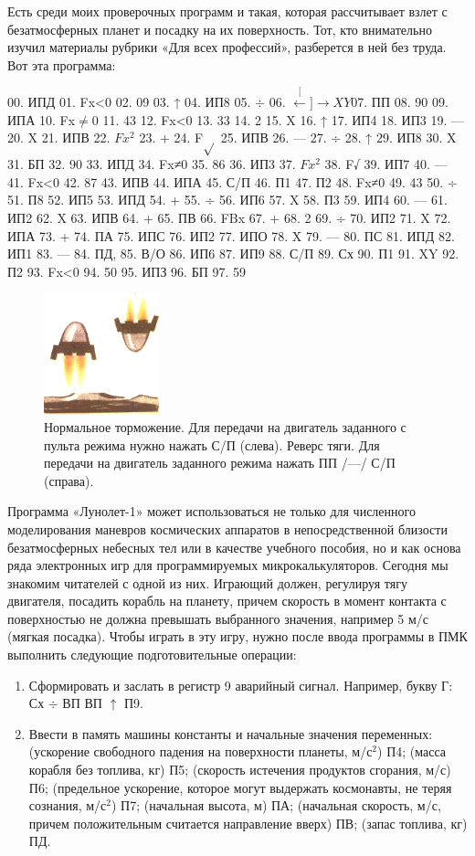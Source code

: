 \documentclass[11pt,a4paper,oneside]{article}
\def\XY{$\stackrel[\leftarrow]{\rightarrow}{XY}$}
\begin{document}
Есть среди моих проверочных программ и такая, которая рассчитывает взлет с безатмосферных планет и посадку на их поверхность. Тот, кто внимательно изучил материалы рубрики «Для всех профессий», разберется в ней без труда. Вот эта программа:

00. ИПД 01. Fx<0 02. 09 03. ↑ 04. ИП8 05. $\div$ 06. \XY 07. ПП 08. 90 09. ИПА 10. Fx$\neq$0 11. 43 12. Fx<0 13. 33 14. 2 15. X 16. ↑ 17. ИП4 18. ИП3
19. 	— 20. X 21. ИПВ 22. $Fx^{2}$ 23. + 24. F$\sqrt{}$ 25. ИПВ 26. — 27. ÷ 28. ↑ 29. ИП8 30. X 31. БП 32. 90
33. 	ИПД 34. Fx≠0 35. 86 36. ИП3 37. $Fx^{2}$ 38. F√ 39. ИП7 40. — 41. Fx<0 42. 87 43. ИПВ 44. ИПА
45. С/П 46. П1 47. П2 48. Fx≠0 49. 43 50. ÷ 51. П8
52. 	ИП5	53.	ИПД 54. + 55. ÷ 56. ИП6 57. X 58. П3
59. ИП4	60.	— 61. ИП2 62. X 63. ИПВ	64.	+ 65. ПВ
66. FBx 67. + 68. 2 69. ÷ 70. ИП2 71. X 72. ИПА
73. 	+ 74. ПА 75. ИПС 76. ИП2 77. ИПО 78. X 79. — 80. ПС 81. ИПД 82. ИП1 83. — 84. ПД, 85. В/О
86. ИП6	87.	ИП9 88. С/П 89. Сх 90. П1 91. XY 92. П2
93. 	Fx<0 94. 50 95. ИПЗ 96. БП 97. 59

\pagebreak
\begin{figure}
\includegraphics[width=0.3\textwidth]{lunolet1_orientation}
\caption{Нормальное торможение. Для передачи на двигатель заданного с пульта режима нужно нажать С/П (слева). Реверс тяги. Для передачи на двигатель заданного режима нажать ПП /—/ С/П (справа).}
\end{figure}
Программа «Лунолет-1» может использоваться не только для численного моделирования маневров космических аппаратов в непосредственной близости безатмосферных небесных тел или в качестве учебного пособия, но и как основа ряда электронных игр для программируемых микрокалькуляторов. Сегодня мы знакомим читателей с одной из них. Играющий должен, регулируя тягу двигателя, посадить корабль на планету, причем скорость в момент контакта с поверхностью не должна превышать выбранного значения, например 5 м/с (мягкая посадка). Чтобы играть в эту игру, нужно после ввода программы в ПМК выполнить следующие подготовительные операции:

\begin{enumerate}
\item Сформировать и заслать в регистр 9 аварийный сигнал. Например, букву Г: Сх $\div$ ВП ВП $\uparrow$ П9.
\item Ввести в память машины константы и начальные значения переменных: (ускорение свободного падения на поверхности планеты, м/с$^{2}$) П4; (масса корабля без топлива, кг) П5; (скорость истечения продуктов сгорания, м/с) П6; (предельное ускорение, которое могут выдержать космонавты, не теряя сознания, м/с$^{2}$) П7; (начальная высота, м) ПА; (начальная скорость, м/с, причем положительным считается направление вверх) ПВ; (запас топлива, кг) ПД.
\end{enumerate}
\end{document}
